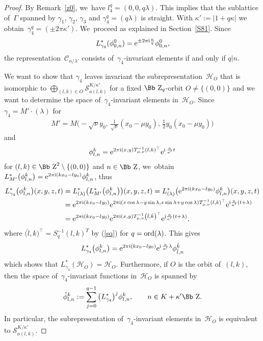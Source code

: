 \documentclass[10pt,a4paper]{amsart}
\newcommand\ZZ{{\mbox{\Bb Z}}}
\newcommand\cC{{\mathcal C}}
\newcommand\cH{{\mathcal H}}
\newcommand{\ord}{{\rm ord}}
\numberwithin{equation}{section}
\begin{document}
\begin{proof} By Remark~\ref{z0}, we~have $l_4^q=(0,0,q\lambda)$. This implies that the sublattice of~$\Gamma$ spanned by $\gamma_1$, $\gamma_2$, $\gamma_3$ and $\gamma_4^q=(q\lambda)$ is straight. With $\kappa':=|1+q\kappa|$ we obtain~$\gamma_4^q=(\pm 2\pi\kappa')$. We~proceed as explained in Section~\ref{S81}. Since
\begin{gather*}
L_{\gamma_4}^*(\phi^0_{0,n})={\rm e}^{\pm2\pi {\rm i} \frac nq} \phi^0_{0,n},
\end{gather*}
the representation~$\cC_{n/\lambda'}$ consists of~$\gamma_4$-invariant elements if and only if $q|n$.

We want to show that $\gamma_4$ leaves invariant the subrepresentation~$\cH_O$ that is isomorphic to $\bigoplus _{(l,k)\in O} {\mathcal S}_{a(l,k)}^{K/\kappa'}$ for a fixed $\ZZ_q$-orbit $O\not=\{(0,0)\}$ and we want to determine the space of~$\gamma_4$-invariant elements in~$\cH_O$. Since $\gamma_4=M'\cdot(\lambda)$ for
\begin{gather*}
M'=M\bigg({-}\sqrt\nu y_0,\,\frac1{\sqrt\nu}(x_0-\mu y_0),\,\frac12 y_0(x_0-\mu y_0)\bigg)
\end{gather*}
and
\begin{gather*}
\phi_{l,n}^k={\rm e}^{2\pi {\rm i}(x,y)T_{\mu,\nu}^{-1}( l, k)^\top} {\rm e}^{{\rm i}\,\frac n{\kappa'} t}
\end{gather*}
for $(l,k)\in \ZZ^2\setminus \{(0,0)\}$ and $n\in \ZZ$, we~obtain~$L^*_{M'}\big(\phi^k_{l,n}\big)={\rm e}^{2\pi {\rm i}(kx_0-ly_0)}\phi^k_{l,n}$, thus
\begin{align*}
L_{\gamma_4}^*\big(\phi^k_{l,n}\big)(x,y,z,t) &= L_{(\lambda)}^*\big(L_{M'}^*\big(\phi^k_{l,n}\big)\big)(x,y,z,t)
=L_{(\lambda)}^*\big({\rm e}^{2\pi {\rm i}(kx_0-ly_0)}\phi^k_{l,n}\big)(x,y,z,t)
\\
&={\rm e}^{2\pi {\rm i}(kx_0-ly_0)} {\rm e}^{2\pi {\rm i}(x\cos\lambda-y\sin\lambda,x\sin\lambda+y\cos \lambda)T_{\mu,\nu}^{-1}(l,k)^\top}{\rm e}^{{\rm i} \frac n{\kappa'} (t+\lambda)}
\\
&={\rm e}^{2\pi {\rm i}(kx_0-ly_0)}{\rm e}^{2\pi {\rm i}(x,y)T_{\mu,\nu}^{-1}\left(\hat l,\hat k\right)^\top}{\rm e}^{{\rm i} \frac n{\kappa'} (t+\lambda)},
\end{align*}
where $\big(\hat l,\hat k\big)^\top=S^{-1}_q(l,k)^T$ by (\ref{sq}) for $q=\ord(\lambda)$. This gives
\begin{gather*}
L_{\gamma_4}^*\big(\phi^k_{l,n}\big)={\rm e}^{2\pi {\rm i}(kx_0-ly_0)}{\rm e}^{{\rm i}\,\frac n{\kappa'} \lambda}\phi_{\hat l,n}^{\hat k}
\end{gather*}
which shows that $L^*_{\gamma_4}(\cH_O)=\cH_O$. Furthermore, if $O$ is the orbit of~$(l,k)$, then the space of~$\gamma_4$-invariant functions in~$\cH_O$ is spanned by
\begin{gather*}
\hat \phi_{l,n}^k:=\sum_{j=0}^{q-1}\big(L^*_{\gamma_4}\big)^j\phi_{l,n}^k,\qquad
n\in K+\kappa'\ZZ.
\end{gather*}
In particular, the subrepresentation of~$\gamma_4$-invariant elements in~$\cH_O$ is equivalent to ${\mathcal S}_{a(l,k)}^{K/\kappa'}$.
\end{proof}
%
\end{document}
